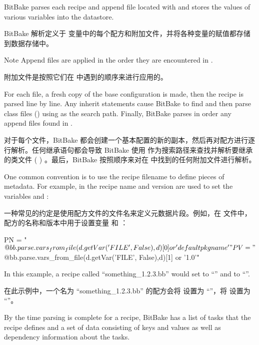 BitBake parses each recipe and append file located with  and stores the values of various variables into the datastore.

BitBake 解析定义于  变量中的每个配方和附加文件，并将各种变量的赋值都存储到数据存储中。

\begin{noteblock}{Note}%
Append files are applied in the order they are encountered in .

\medskip
附加文件是按照它们在  中遇到的顺序来进行应用的。
\end{noteblock}

For each file, a fresh copy of the base configuration is made, then the recipe is parsed line by line. Any inherit statements cause BitBake to find and then parse class files () using  as the search path. Finally, BitBake parses in order any append files found in .

对于每个文件，BitBake 都会创建一个基本配置的新的副本，然后再对配方进行逐行解析。任何继承语句都会导致 BitBake 使用  作为搜索路径来查找并解析要继承的类文件 ( ) 。最后，BitBake 按照顺序来对在  中找到的任何附加文件进行解析。

One common convention is to use the recipe filename to define pieces of metadata. For example, in  the recipe name and version are used to set the variables  and :

一种常见的约定是使用配方文件的文件名来定义元数据片段。例如，在  文件中，配方的名称和版本中用于设置变量  和 ：

\begin{pyglist}
PN = "${@bb.parse.vars_from_file(d.getVar('FILE', False),d)[0] or 'defaultpkgname'}"
PV = "${@bb.parse.vars_from_file(d.getVar('FILE', False),d)[1] or '1.0'}"
\end{pyglist}

In this example, a recipe called ``something\_1.2.3.bb'' would set  to ``'' and  to ``''.

在此示例中，一个名为 ``something\_1.2.3.bb'' 的配方会将  设置为 ``''，将  设置为 ``''。

By the time parsing is complete for a recipe, BitBake has a list of tasks that the recipe defines and a set of data consisting of keys and values as well as dependency information about the tasks.

